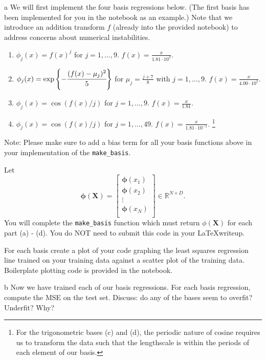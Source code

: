 \documentclass[expanded]{lkx_pset}
\begin{document}
\begin{parts}
  \begin{part}{a}
    We will first implement the four basis regressions below. (The first basis has been implemented for you in the notebook as an example.) Note that we introduce an addition transform $f$ (already into the provided notebook) to address concerns about numerical instabilities.
    \begin{enumerate}
      \item $\phi_j(x)= f(x)^j$ for $j=1,\ldots, 9$. $f(x) = \frac{x}{1.81 \cdot 10^{2}}.$
      \item $\phi_j(x) = \exp\left\{-\cfrac{(f(x)-\mu_j)^2}{5}\right\}$ for $\mu_j=\frac{j + 7}{8}$ with $j=1,\ldots, 9$. $f(x) = \frac{x}{4.00 \cdot 10^{2}}.$
      \item $\phi_j(x) =  \cos(f(x) / j)$ for $j=1, \ldots, 9$. $f(x) = \frac{x}{1.81}$.
      \item $\phi_j(x) = \cos(f(x) / j)$ for $j=1, \ldots, 49$. $f(x) = \frac{x}{1.81 \cdot 10^{-1}}$. \footnote{For the trigonometric bases (c) and (d), the periodic nature of
    cosine requires us to transform the data such that the 
    lengthscale is within the periods of each element of our basis.}
    \end{enumerate}

    {\footnotesize * Note: Please make sure to add a bias term for
    all your basis functions above in your implementation of the 
    \verb|make_basis|.}

    Let $$ \mathbf{\phi}(\mathbf{X}) = 
    \begin{bmatrix} 
    \mathbf{\phi}(x_1) \\
    \mathbf{\phi}(x_2) \\
    \vdots \\
    \mathbf{\phi}(x_N) \\
    \end{bmatrix} \in \mathbb{R}^{N\times D}.$$
    You will complete the \verb|make_basis| function which must return $\phi(\mathbf{X})$ for each part (a) - (d). You do NOT need to submit this code in your \LaTeX writeup.

    For each basis create a plot of your code graphing the least squares regression line trained on your training data against a scatter plot of the training data. Boilerplate plotting code is provided in the notebook.
  \end{part}

  \begin{part}{b}
    Now we have trained each of our basis regressions.  For each basis
    regression, compute the MSE on the test set.  Discuss: do any of the
    bases seem to overfit?  Underfit?  Why?
  \end{part}


\end{parts}
\end{document}
